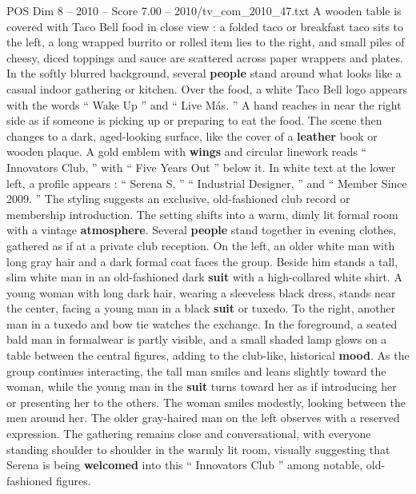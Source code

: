 \begin{textsample}{POS Dim 8 – 2010 – Score 7.00 – 2010/tv\_com\_2010\_47.txt}  \label{ex:f8_pos_027}
A wooden table is covered with Taco Bell food in close view : a folded taco or breakfast taco sits to the left, a long wrapped burrito or rolled item lies to the right, and small piles of cheesy, diced toppings and sauce are scattered across paper wrappers and plates.
In the softly blurred background, several \textbf{people} stand around what looks like a casual indoor gathering or kitchen.
Over the food, a white Taco Bell logo appears with the words “ Wake Up ” and “ Live Más. ” A hand reaches in near the right side as if someone is picking up or preparing to eat the food.
The scene then changes to a dark, aged-looking surface, like the cover of a \textbf{leather} book or wooden plaque.
A gold emblem with \textbf{wings} and circular linework reads “ Innovators Club, ” with “ Five Years Out ” below it.
In white text at the lower left, a profile appears : “ Serena S, ” “ Industrial Designer, ” and “ Member Since 2009. ” The styling suggests an exclusive, old-fashioned club record or membership introduction.
The setting shifts into a warm, dimly lit formal room with a vintage \textbf{atmosphere}.
Several \textbf{people} stand together in evening clothes, gathered as if at a private club reception.
On the left, an older white man with long gray hair and a dark formal coat faces the group.
Beside him stands a tall, slim white man in an old-fashioned dark \textbf{suit} with a high-collared white shirt.
A young woman with long dark hair, wearing a sleeveless black dress, stands near the center, facing a young man in a black \textbf{suit} or tuxedo.
To the right, another man in a tuxedo and bow tie watches the exchange.
In the foreground, a seated bald man in formalwear is partly visible, and a small shaded lamp glows on a table between the central figures, adding to the club-like, historical \textbf{mood}.
As the group continues interacting, the tall man smiles and leans slightly toward the woman, while the young man in the \textbf{suit} turns toward her as if introducing her or presenting her to the others.
The woman smiles modestly, looking between the men around her.
The older gray-haired man on the left observes with a reserved expression.
The gathering remains close and conversational, with everyone standing shoulder to shoulder in the warmly lit room, visually suggesting that Serena is being \textbf{welcomed} into this “ Innovators Club ” among notable, old-fashioned figures.

\end{textsample}
